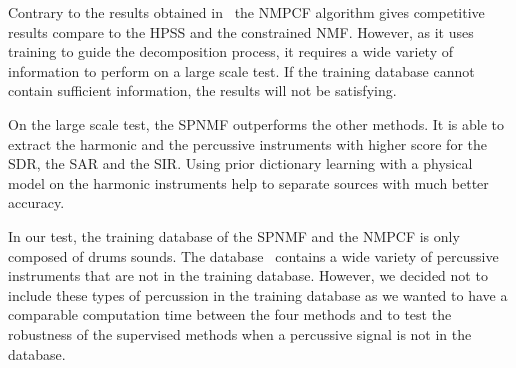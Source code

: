 Contrary to the results obtained in~\cite{canadas2014percussive} the NMPCF algorithm gives competitive results compare to the HPSS and the constrained NMF. However, as it uses training to guide the decomposition process, it requires a wide variety of information to perform on a large scale test. If the training database cannot contain sufficient information, the results will not be satisfying. 

On the large scale test, the SPNMF outperforms the other methods. It is able to extract the harmonic and the percussive instruments with higher score for the SDR, the SAR and the SIR. Using prior dictionary learning with a physical model on the harmonic instruments help to separate sources with much better accuracy.

In our test, the training database of the SPNMF and the NMPCF is only composed of drums sounds. The database~\cite{bittner2014medleydb} contains a wide variety of percussive instruments that are not in the training database. However, we decided not to include these types of percussion in the training database as we wanted to have a comparable computation time between the four methods and to test the robustness of the supervised methods when a percussive signal is not in the database. 
